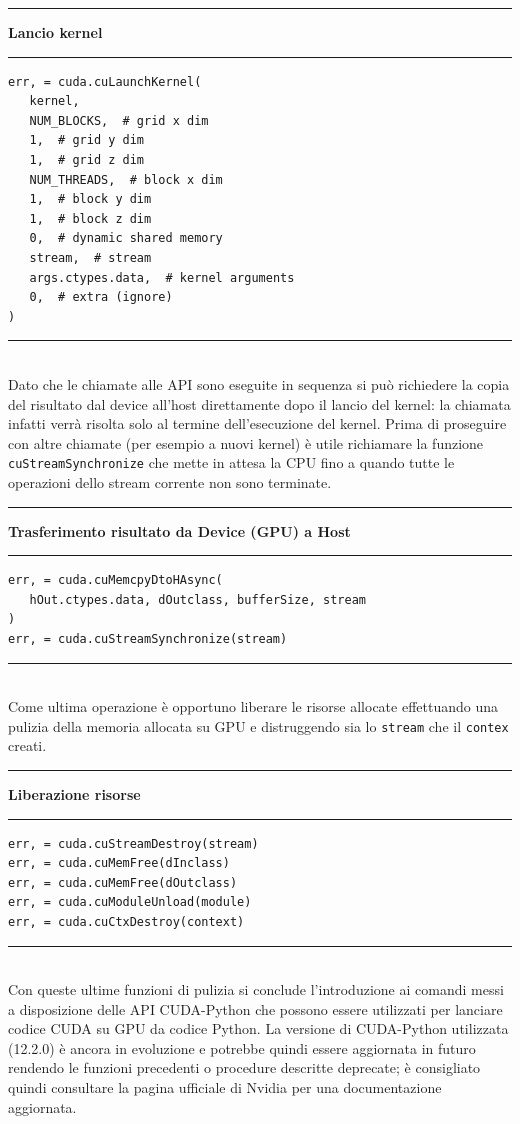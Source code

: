 \documentclass[12pt,a4paper]{report}
\begin{document}
\noindent\rule[0.5ex]{\linewidth}{2pt}
\small{\textbf{Lancio kernel}} \\
\noindent\rule[0.5ex]{\linewidth}{1pt}
\begin{lstlisting}
err, = cuda.cuLaunchKernel(
   kernel,
   NUM_BLOCKS,  # grid x dim
   1,  # grid y dim
   1,  # grid z dim
   NUM_THREADS,  # block x dim
   1,  # block y dim
   1,  # block z dim
   0,  # dynamic shared memory
   stream,  # stream
   args.ctypes.data,  # kernel arguments
   0,  # extra (ignore)
)
\end{lstlisting}
\noindent\rule[0.5ex]{\linewidth}{1pt} \\[10pt]
Dato che le chiamate alle API sono eseguite in sequenza si può richiedere la copia del risultato dal device all'host direttamente dopo il lancio del kernel: la chiamata infatti verrà risolta solo al termine dell'esecuzione del kernel. \newline
Prima di proseguire con altre chiamate (per esempio a nuovi kernel) è utile richiamare la funzione \verb|cuStreamSynchronize| che mette in attesa la CPU fino a quando tutte le operazioni dello stream corrente non sono terminate. \newpage

\noindent\rule[0.5ex]{\linewidth}{2pt}
\small{\textbf{Trasferimento risultato da Device (GPU) a Host}} \\
\noindent\rule[0.5ex]{\linewidth}{1pt}
\begin{lstlisting}
err, = cuda.cuMemcpyDtoHAsync(
   hOut.ctypes.data, dOutclass, bufferSize, stream
)
err, = cuda.cuStreamSynchronize(stream)
\end{lstlisting}
\noindent\rule[0.5ex]{\linewidth}{1pt} \\[10pt]
Come ultima operazione è opportuno liberare le risorse allocate effettuando una pulizia della memoria allocata su GPU e distruggendo sia lo \verb|stream| che il \verb|contex| creati. \newline

\noindent\rule[0.5ex]{\linewidth}{2pt}
\small{\textbf{Liberazione risorse}} \\
\noindent\rule[0.5ex]{\linewidth}{1pt}
\begin{lstlisting}
err, = cuda.cuStreamDestroy(stream)
err, = cuda.cuMemFree(dInclass)
err, = cuda.cuMemFree(dOutclass)
err, = cuda.cuModuleUnload(module)
err, = cuda.cuCtxDestroy(context)
\end{lstlisting}
\noindent\rule[0.5ex]{\linewidth}{1pt} \\[10pt]
Con queste ultime funzioni di pulizia si conclude l'introduzione ai comandi messi a disposizione delle API CUDA-Python che possono essere utilizzati per lanciare codice CUDA su GPU da codice Python. \newline
La versione di CUDA-Python utilizzata (12.2.0) è ancora in evoluzione e potrebbe quindi essere aggiornata in futuro rendendo le funzioni precedenti o procedure descritte deprecate; è consigliato quindi consultare la pagina ufficiale di Nvidia per una documentazione aggiornata. \newpage
\end{document}

